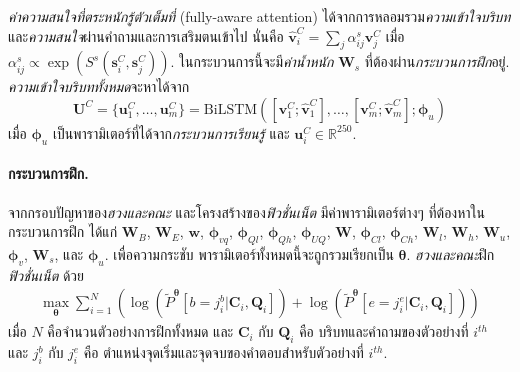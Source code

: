 \textit{ค่าความสนใจที่ตระหนักรู้ตัวเต็มที่} (fully-aware attention)
ได้จากการหลอมรวม\textit{ความเข้าใจบริบท}และ\textit{ความสนใจ}ผ่านคำถามและการเสริมตนเข้าไป
นั่นคือ
$\bm{\hat{v}}^C_i = \sum_j \alpha^s_{ij} \bm{v}^C_j$
เมื่อ $\alpha^s_{ij} \propto \exp(S^s(\bm{s}^C_i, \bm{s}^C_j))$.
ในกระบวนการนี้จะมี\textit{ค่าน้ำหนัก} $\bm{W}_s$ ที่ต้องผ่าน\textit{กระบวนการฝึก}อยู่.
\textit{ความเข้าใจบริบททั้งหมด}จะหาได้จาก
\begin{equation}
\bm{U}^C = \{ \bm{u}^C_1, \ldots, \bm{u}^C_m \} = \mathrm{BiLSTM}([\bm{v}^C_1;\bm{\hat{v}}^C_1], \ldots, [\bm{v}^C_m;\bm{\hat{v}}^C_m]; \bm{\phi}_u)
\label{eq: opt fusion net context understanding}
\end{equation}
เมื่อ $\bm{\phi}_u$ เป็นพารามิเตอร์ที่ได้จาก\textit{กระบวนการเรียนรู้}
และ $\bm{u}^C_i \in \mathbb{R}^{250}$.

\paragraph{กระบวนการฝึก.}
จากกรอบปัญหาของ\textit{ฮวงและคณะ} และโครงสร้างของ\textit{ฟิวชั่นเน็ต}
มีค่าพารามิเตอร์ต่างๆ ที่ต้องหาในกระบวนการฝึก 
ได้แก่ $\bm{W}_B$, $\bm{W}_E$, $\bm{w}$,
$\bm{\phi}_{vq}$, $\bm{\phi}_{Ql}$, 
$\bm{\phi}_{Qh}$, $\bm{\phi}_{UQ}$,
$\bm{W}$, 
$\bm{\phi}_{Cl}$, $\bm{\phi}_{Ch}$,
$\bm{W}_l$, $\bm{W}_h$, $\bm{W}_u$,
$\bm{\phi}_v$, $\bm{W}_s$,
และ $\bm{\phi}_u$.
เพื่อความกระชับ พารามิเตอร์ทั้งหมดนี้จะถูกรวมเรียกเป็น $\bm{\theta}$.
\textit{ฮวงและคณะ}ฝึก\textit{ฟิวชั่นเน็ต} ด้วย
\begin{eqnarray}
\max_{\bm{\theta}}
 \sum_{i=1}^N \left( 
 \log (\tilde{P}^{\bm{\theta}}[b=j^b_i|\bm{C}_i, \bm{Q}_i])
 +
 \log (\tilde{P}^{\bm{\theta}}[e=j^e_i|\bm{C}_i, \bm{Q}_i])
 \right)
\end{eqnarray}
เมื่อ $N$ คือจำนวนตัวอย่างการฝึกทั้งหมด
และ
$\bm{C}_i$ กับ $\bm{Q}_i$ 
คือ บริบทและคำถามของตัวอย่างที่ $i^{th}$
และ
$j^b_i$ กับ $j^e_i$
คือ ตำแหน่งจุดเริ่มและจุดจบของคำตอบสำหรับตัวอย่างที่ $i^{th}$.

